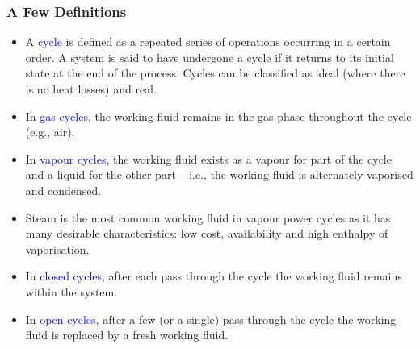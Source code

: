 \documentclass[10pt,compress,handout,ignorenonframetext]{beamer}
\begin{document}
\begin{frame}
 \frametitle{A Few Definitions}
 \begin{itemize}
  \item <1-> A \textcolor{blue}{cycle} is defined as a repeated series of operations occurring in a certain order. A system is said to have undergone a cycle if it returns to its initial state at the end of the process.  Cycles can be classified as ideal (where there is no heat losses) and real. 
  \item <2-> In \textcolor{blue}{gas cycles}, the working fluid remains in the gas phase throughout the cycle (e.g., air).
  \item <3-> In \textcolor{blue}{vapour cycles}, the working fluid exists as a vapour for part of the cycle and a liquid for the other part -- i.e., the working fluid is alternately vaporised and condensed.
  \item <4-> Steam is the most common working fluid in vapour power cycles as it has many desirable characteristics: low cost, availability and high enthalpy of vaporisation.
  \item <5-> In \textcolor{blue}{closed cycles}, after each pass through the cycle the working fluid remains within the system.
  \item <6-> In \textcolor{blue}{open cycles}, after a few (or a single) pass through the cycle the working fluid is replaced by a fresh working fluid.
 \end{itemize}
\end{frame}
\end{document}
